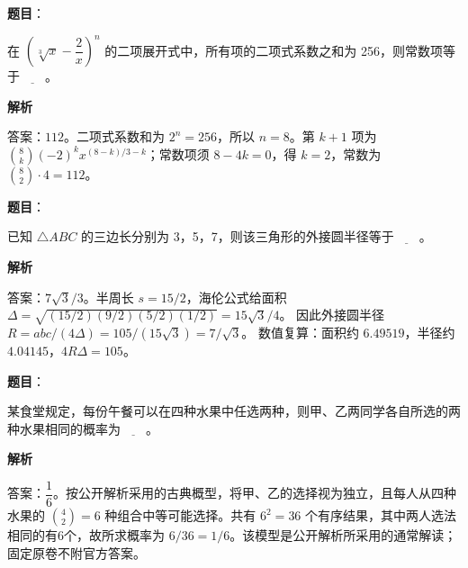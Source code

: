 \begin{answer}

\textbf{题目}：

在 \(\left(\sqrt[3]{x}-\dfrac2x\right)^n\) 的二项展开式中，所有项的二项式系数之和为 256，则常数项等于\(\underline{\qquad}\)。

\textbf{解析}

答案：\(112\)。二项式系数和为 \(2^n=256\)，所以 \(n=8\)。第 \(k+1\) 项为 \(\binom8k(-2)^k x^{(8-k)/3-k}\)；常数项须 \(8-4k=0\)，得 \(k=2\)，常数为 \(\binom82\cdot4=112\)。


\end{answer}
\begin{answer}

\textbf{题目}：

已知 \(\triangle ABC\) 的三边长分别为 3，5，7，则该三角形的外接圆半径等于\(\underline{\qquad}\)。

\textbf{解析}

答案：\(7\sqrt3/3\)。半周长 \(s=15/2\)，海伦公式给面积
\(\Delta=\sqrt{(15/2)(9/2)(5/2)(1/2)}=15\sqrt3/4\)。
因此外接圆半径 \(R=abc/(4\Delta)=105/(15\sqrt3)=7/\sqrt3\)。
数值复算：面积约 \(6.49519\)，半径约 \(4.04145\)，\(4R\Delta=105\)。


\end{answer}
\begin{answer}

\textbf{题目}：

某食堂规定，每份午餐可以在四种水果中任选两种，则甲、乙两同学各自所选的两种水果相同的概率为\(\underline{\qquad}\)。

\textbf{解析}

答案：\(\dfrac16\)。按公开解析采用的古典概型，将甲、乙的选择视为独立，且每人从四种水果的 \(\binom42=6\) 种组合中等可能选择。共有 \(6^2=36\) 个有序结果，其中两人选法相同的有6个，故所求概率为 \(6/36=1/6\)。该模型是公开解析所采用的通常解读；固定原卷不附官方答案。


\end{answer}
